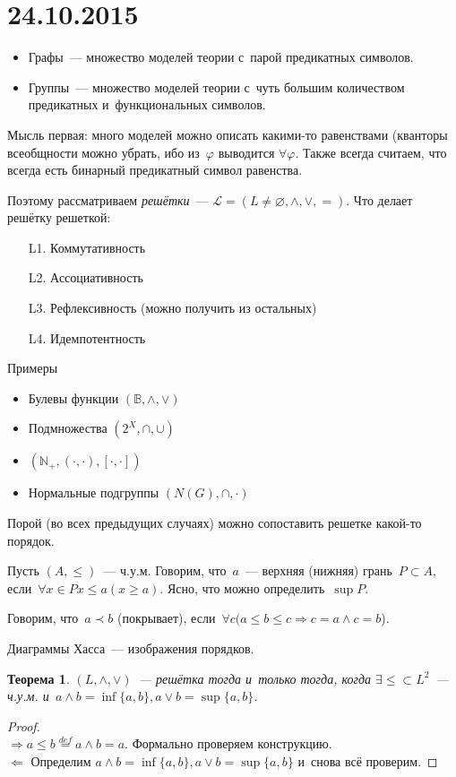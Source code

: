 \documentclass{article}
\newtheorem{theorem}{Теорема}
\renewcommand{\le}{\leqslant}
\renewcommand{\ge}{\geqslant}
\renewcommand{\phi}{\varphi}
\begin{document}
\section*{24.10.2015}

\begin{itemize}
  \item Графы~--- множество моделей теории с~парой предикатных символов.
  \item Группы~--- множество моделей теории с~чуть большим количеством
  предикатных и~функциональных символов.
\end{itemize}

Мысль первая: много моделей можно описать какими-то равенствами (кванторы
всеобщности можно убрать, ибо из~$\phi$ выводится $\forall \phi$. Также
всегда считаем, что всегда есть бинарный предикатный символ равенства.

Поэтому рассматриваем \emph{решётки}~--- $\mathcal{L} = (L \ne \varnothing,
\land, \lor, =)$. Что делает решётку решеткой:

\begin{itemize}
  \item[L1.] Коммутативность
  \item[L2.] Ассоциативность
  \item[L3.] Рефлексивность (можно получить из остальных)
  \item[L4.] Идемпотентность
\end{itemize}

Примеры
\begin{itemize}
  \item Булевы функции $(\mathbb{B}, \land, \lor)$
  \item Подмножества $(2^X, \cap, \cup)$
  \item $(\mathbb{N}_+, (\cdot, \cdot), [\cdot, \cdot])$
  \item Нормальные подгруппы $(N(G), \cap, \cdot)$
\end{itemize}

Порой (во всех предыдущих случаях) можно сопоставить решетке какой-то
порядок.

Пусть $(A, \le)$~--- ч.у.м. Говорим, что~$a$~--- верхняя (нижняя) грань~$P
\subset A$, если~$\forall x \in P x \le a (x \ge a)$. Ясно, что можно
определить~$\sup P$.

Говорим, что~$a \prec b$ (покрывает), если~$\forall c (a \le b \le c
\Rightarrow c = a \land c = b$).

Диаграммы Хасса~--- изображения порядков.

\begin{theorem}
  $(L, \land, \lor)$~--- решётка тогда и~только тогда, когда $\exists
  \le \subset L^2$~--- ч.у.м. и~$a \land b = \inf\{a, b\}, a \lor b =
  \sup\{a, b\}$.
\end{theorem}
\begin{proof}~\\
  $\Longrightarrow a \le b \overset{def}{=} a \land b = a$. Формально проверяем
  конструкцию.\\
  $\Longleftarrow$ Определим $a \land b = \inf\{a, b\}, a \lor b =
  \sup\{a, b\}$ и~снова всё проверим.
\end{proof}
\end{document}

